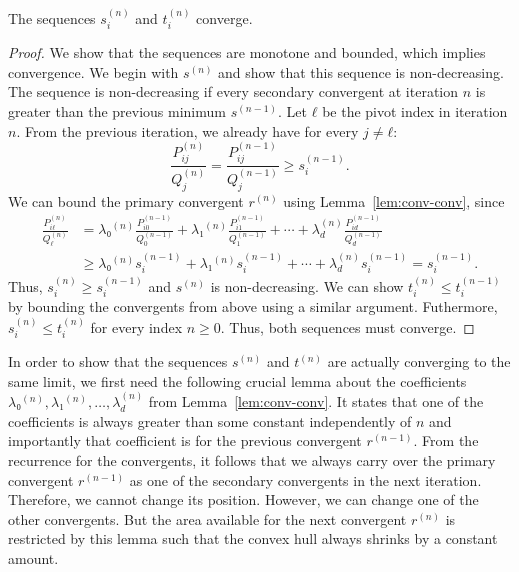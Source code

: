 \begin{lemma}
  The sequences $s_i^{(n)}$ and $t_i^{(n)}$ converge.
\end{lemma}

\begin{proof}
  We show that the sequences are monotone and bounded, which implies convergence.
  We begin with $s^{(n)}$ and show that this sequence is non-decreasing.
  The sequence is non-decreasing if every secondary convergent at iteration $n$
  is greater than the previous minimum $s^{(n-1)}$.
  Let $ℓ$ be the pivot index in iteration $n$.
  From the previous iteration, we already have for every $j ≠ ℓ$:
  \[
    \frac{P_{ij}^{(n)}}{Q_j^{(n)}} = \frac{P_{ij}^{(n-1)}}{Q_j^{(n-1)}} ≥ s_i^{(n-1)}.
  \]
  We can bound the primary convergent $r^{(n)}$ using Lemma~\ref{lem:conv-conv}, since
  \begin{align*}
    \frac{P_{iℓ}^{(n)}}{Q_ℓ^{(n)}}
    & = λ₀^{(n)} \frac{P_{i0}^{(n-1)}}{Q_0^{(n-1)}} + λ₁^{(n)} \frac{P_{i1}^{(n-1)}}{Q_1^{(n-1)}} + ⋯ + λ_d^{(n)} \frac{P_{id}^{(n-1)}}{Q_d^{(n-1)}} \\
    & ≥ λ₀^{(n)} s_i^{(n-1)} + λ₁^{(n)} s_i^{(n-1)} + ⋯ + λ_d^{(n)} s_i^{(n-1)}
      = s_i^{(n-1)}.
  \end{align*}
  Thus, $s_i^{(n)} ≥ s_i^{(n-1)}$ and $s^{(n)}$ is non-decreasing.
  We can show $t_i^{(n)} ≤ t_i^{(n-1)}$ by bounding the convergents from above using a similar argument.
  Futhermore, $s_i^{(n)} ≤ t_i^{(n)}$ for every index $n ≥ 0$.
  Thus, both sequences must converge.
\end{proof}

In order to show that the sequences $s^{(n)}$ and $t^{(n)}$ are actually
converging to the same limit, we first need the following crucial lemma about the
coefficients $λ₀^{(n)}, λ₁^{(n)}, …, λ_d^{(n)}$ from Lemma~\ref{lem:conv-conv}.
It states that one of the coefficients is always greater than some constant
independently of $n$ and importantly that coefficient is for the previous convergent $r^{(n-1)}$.
From the recurrence for the convergents,
it follows that we always carry over the primary convergent $r^{(n-1)}$ as one
of the secondary convergents in the next iteration.
Therefore, we cannot change its position.
However, we can change one of the other convergents.
But the area available for the next convergent $r^{(n)}$ is restricted by this lemma
such that the convex hull always shrinks by a constant amount.

